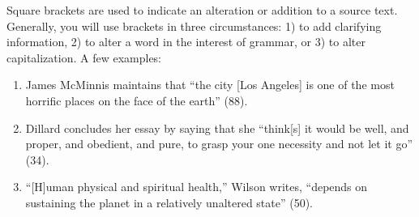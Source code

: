 Square brackets are used to indicate an alteration or addition to a source text.
Generally, you will use brackets in three circumstances: 1) to add clarifying
information, 2) to alter a word in the interest of grammar, or 3) to alter
capitalization. A few examples:

\begin{enumerate}

\item James McMinnis maintains that “the city [Los Angeles] is one of the most
horrific places on the face of the earth” (88).

\item Dillard concludes her essay by saying that she “think[s] it would be well,
and proper, and obedient, and pure, to grasp your one necessity and not let it
go” (34).

\item “[H]uman physical and spiritual health,” Wilson writes, “depends on
sustaining the planet in a relatively unaltered state” (50). 

\end{enumerate}

